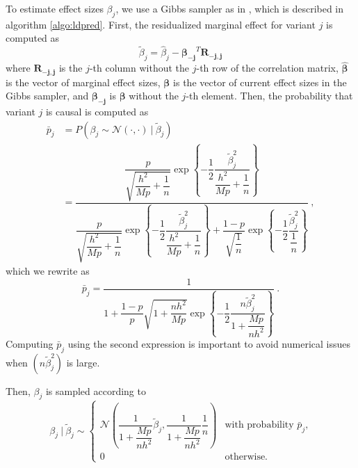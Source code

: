 \documentclass{bioinfo}
\begin{document}
\begin{methods}
\newcommand{\hmpn}{\dfrac{h^2}{M p} + \dfrac{1}{n}}
\newcommand{\phmpn}{\dfrac{p}{\sqrt{\hmpn}}}
\newcommand{\betahmpn}{\dfrac{\tilde{\beta}_j^2}{\hmpn}}

To estimate effect sizes $\beta_j$, we use a Gibbs sampler as in \cite{vilhjalmsson2015modeling}, which is described in algorithm \ref{algo:ldpred}.
First, the residualized marginal effect for variant $j$ is computed as
\begin{equation}\label{eq:beta_res}
\tilde{\beta}_j = \hat{\beta}_j - \boldsymbol{\beta_{-j}}^T \boldsymbol{R_{-j, j}}
\end{equation}
where $\boldsymbol{R_{-j, j}}$ is the $j$-th column without the  $j$-th row of the correlation matrix, $\boldsymbol{\hat{\beta}}$ is the vector of marginal effect sizes, $\boldsymbol{{\beta}}$ is the vector of current effect sizes in the Gibbs sampler, and $\boldsymbol{\beta_{-j}}$ is $\boldsymbol{\beta}$ without the $j$-th element. 
Then, the probability that variant $j$ is causal is computed as 
\begin{equation*}
\begin{split}
\bar{p}_j & = P\left(\beta_j \sim \mathcal N(\cdot,\cdot) ~|~ \tilde{\beta}_j\right) \\
& = \dfrac{\phmpn \exp\left\lbrace-\dfrac{1}{2} \betahmpn\right\rbrace}{\phmpn \exp\left\lbrace-\dfrac{1}{2} \betahmpn\right\rbrace + \dfrac{1-p}{\sqrt{\dfrac{1}{n}}} \exp\left\lbrace-\dfrac{1}{2} \dfrac{\tilde{\beta}_j^2}{\dfrac{1}{n}}\right\rbrace}~,
\end{split}
\end{equation*}
which we rewrite as
\begin{equation}
\bar{p}_j = \dfrac{1}{1 + \dfrac{1-p}{p} \sqrt{1 + \dfrac{n h^2}{Mp}} \exp\left\lbrace-\dfrac{1}{2} \dfrac{n \tilde{\beta}_j^2}{1 + \dfrac{Mp}{n h^2}}\right\rbrace}~.\label{eq:postp}
\end{equation}
Computing $\bar{p}_j$ using the second expression is important to avoid numerical issues when $\left(n \tilde{\beta}_j^2\right)$ is large.

Then, $\beta_j$ is sampled according to
\begin{equation}\label{eg:random_beta}
\beta_j ~|~ \tilde{\beta}_j \sim \left\{
\begin{array}{ll}
\mathcal N\left(\dfrac{1}{1 + \dfrac{M p}{n h^2}} \tilde{\beta}_j, \dfrac{1}{1 + \dfrac{M p}{n h^2}}\dfrac{1}{n}\right) & \mbox{with probability $\bar{p}_j$,} \\
0 & \mbox{otherwise.}
\end{array}
\right.
\end{equation}


\end{methods}
\end{document}
